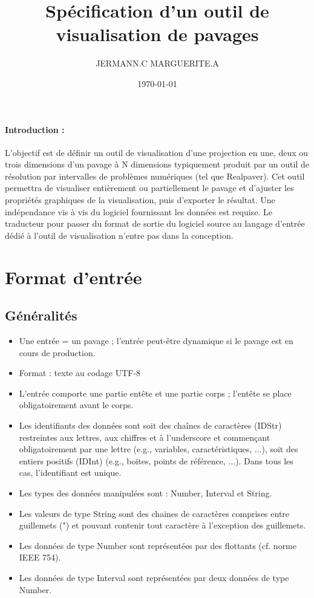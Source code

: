 \documentclass[a4paper]{article}
\title{\textbf{Spécification d'un outil de visualisation de pavages}}
\author{ JERMANN.C MARGUERITE.A}
\date{\today}
\begin{document}
\maketitle{}
\renewcommand\labelitemi{\textbullet}

\paragraph{Introduction :} L'objectif est de définir un outil de visualisation d'une projection en une, deux ou trois dimensions d'un pavage à N dimensions typiquement produit par un outil de résolution par intervalles de problèmes numériques (tel que Realpaver). Cet outil permettra de visualiser entièrement ou partiellement le pavage et d'ajuster les propriétés graphiques de la visualisation, puis d'exporter le résultat. Une indépendance vis à vis du logiciel fournissant les données est requise. Le traducteur pour passer du format de sortie du logiciel source au langage d'entrée dédié à l'outil de visualisation n'entre pas dans la conception.

\section{Format d'entrée}

\subsection{Généralités}
\begin{itemize}
\item Une entrée = un pavage ; l'entrée peut-être dynamique si le pavage est en cours de production.
\item Format : texte au codage UTF-8
\item L'entrée comporte une partie entête et une partie corps ; l'entête se place obligatoirement avant le corps.
\item Les identifiants des données sont soit des chaînes de caractères (IDStr) restreintes aux lettres, aux chiffres et à l'underscore et commençant obligatoirement par une lettre (e.g., variables, caractéristiques, ...), soit des entiers positifs (IDInt) (e.g., boites, points de référence, ...). Dans tous les cas, l'identifiant est unique.
\item Les types des données manipulées sont : Number, Interval et String.
\item Les valeurs de type String sont des chaines de caractères comprises entre guillemets (") et pouvant contenir tout caractère à l'exception des guillemets.
\item Les données de type Number sont représentées par des flottants (cf. norme IEEE 754).
\item Les données de type Interval sont représentées par deux données de type Number.
\end{itemize}
\end{document}
